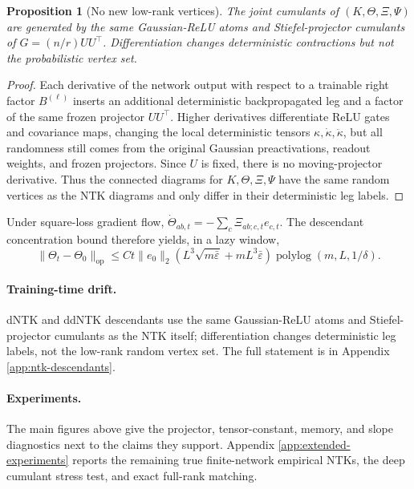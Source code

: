 \documentclass{article}
\newtheorem{proposition}[theorem]{Proposition}
\newcommand{\op}{\mathrm{op}}
\newcommand{\barE}{\bar\varepsilon}
\begin{document}
\begin{proposition}[No new low-rank vertices]
\label{prop:no-new-vertices}
The joint cumulants of \((K,\Theta,\Xi,\Psi)\) are generated by the same Gaussian-ReLU atoms and Stiefel-projector cumulants of \(G=(n/r)UU^\top\). Differentiation changes deterministic contractions but not the probabilistic vertex set.
\end{proposition}

\begin{proof}
Each derivative of the network output with respect to a trainable right factor \(B^{(\ell)}\) inserts an additional deterministic backpropagated leg and a factor of the same frozen projector \(UU^\top\). Higher derivatives differentiate ReLU gates and covariance maps, changing the local deterministic tensors \(\kappa,\dot\kappa,\ddot\kappa\), but all randomness still comes from the original Gaussian preactivations, readout weights, and frozen projectors. Since \(U\) is fixed, there is no moving-projector derivative. Thus the connected diagrams for \(K,\Theta,\Xi,\Psi\) have the same random vertices as the NTK diagrams and only differ in their deterministic leg labels.
\end{proof}

Under square-loss gradient flow, \(\dot\Theta_{ab,t}=-\sum_c\Xi_{ab;c,t}e_{c,t}\). The descendant concentration bound therefore yields, in a lazy window,
\begin{equation}
\|\Theta_t-\Theta_0\|_{\op}
\le
C t\|e_0\|_2\left(L^3\sqrt{m\barE}+mL^3\barE\right)\operatorname{polylog}(m,L,1/\delta).
\end{equation}
\fi

\paragraph{Training-time drift.}
dNTK and ddNTK descendants use the same Gaussian-ReLU atoms and Stiefel-projector cumulants as the NTK itself; differentiation changes deterministic leg labels, not the low-rank random vertex set. The full statement is in Appendix \ref{app:ntk-descendants}.

\paragraph{Experiments.}
The main figures above give the projector, tensor-constant, memory, and slope diagnostics next to the claims they support. Appendix \ref{app:extended-experiments} reports the remaining true finite-network empirical NTKs, the deep cumulant stress test, and exact full-rank matching.
\end{document}
